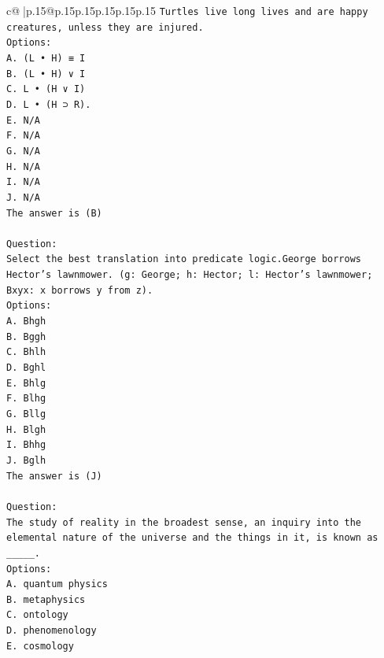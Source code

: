 \documentclass{article}
\begin{document}
{\begin{supertabular}{c@{$\;$}|p{.15\linewidth}@{}p{.15\linewidth}p{.15\linewidth}p{.15\linewidth}p{.15\linewidth}p{.15\linewidth}}
{{{\texttt{Turtles live long lives and are happy creatures, unless they are injured.} \\
\texttt{Options:} \\
\texttt{A. (L • H) ≡ I} \\
\texttt{B. (L • H) ∨ I} \\
\texttt{C. L • (H ∨ I)} \\
\texttt{D. L • (H ⊃ R).} \\
\texttt{E. N/A} \\
\texttt{F. N/A} \\
\texttt{G. N/A} \\
\texttt{H. N/A} \\
\texttt{I. N/A} \\
\texttt{J. N/A} \\
\texttt{The answer is (B)} \\
\\ 
\texttt{Question:} \\
\texttt{Select the best translation into predicate logic.George borrows Hector's lawnmower. (g: George; h: Hector; l: Hector's lawnmower; Bxyx: x borrows y from z).} \\
\texttt{Options:} \\
\texttt{A. Bhgh} \\
\texttt{B. Bggh} \\
\texttt{C. Bhlh} \\
\texttt{D. Bghl} \\
\texttt{E. Bhlg} \\
\texttt{F. Blhg} \\
\texttt{G. Bllg} \\
\texttt{H. Blgh} \\
\texttt{I. Bhhg} \\
\texttt{J. Bglh} \\
\texttt{The answer is (J)} \\
\\ 
\texttt{Question:} \\
\texttt{The study of reality in the broadest sense, an inquiry into the elemental nature of the universe and the things in it, is known as \_\_\_\_\_.} \\
\texttt{Options:} \\
\texttt{A. quantum physics} \\
\texttt{B. metaphysics} \\
\texttt{C. ontology} \\
\texttt{D. phenomenology} \\
\texttt{E. cosmology} \\
}}}
\end{supertabular}}
\end{document}
